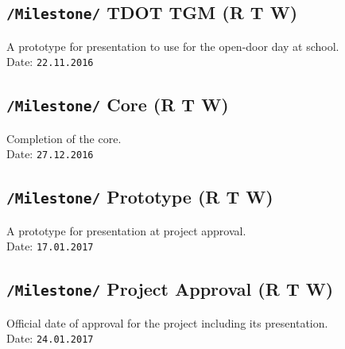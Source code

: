 \documentclass[11pt]{article}
\begin{document}
\subsection{\texttt{/Milestone/} TDOT TGM \small{(R T W)}}
A prototype for presentation to use for the open-door day at school.
\\ Date: \texttt{22.11.2016}
\subsection{\texttt{/Milestone/} Core \small{(R T W)}}
Completion of the core.
\\ Date: \texttt{27.12.2016}
\subsection{\texttt{/Milestone/} Prototype \small{(R T W)}}
A prototype for presentation at project approval.
\\ Date: \texttt{17.01.2017}
\subsection{\texttt{/Milestone/} Project Approval \small{(R T W)}}
Official date of approval for the project including its presentation.
\\ Date: \texttt{24.01.2017}
\end{document}
